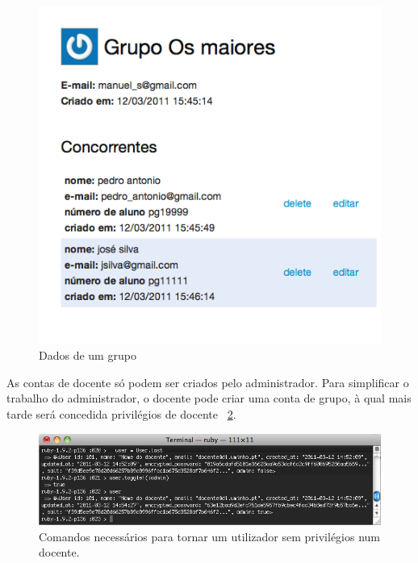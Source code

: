 \begin{figure}[H]
\begin{center}
\includegraphics[scale = 0.6]{Images/grupo}
\caption{Dados de um grupo}\label{img:grupo}
\end{center}
\end{figure} 



As contas de docente só podem ser criados pelo administrador. Para simplificar o trabalho do administrador, o docente pode criar 
uma conta de grupo, à qual mais tarde será concedida privilégios de docente ~\ref{img:userToAdmin}.

\begin{figure}[H]
\begin{center}
\includegraphics[scale=0.60]{Images/userToAdmin}
\caption{Comandos necessários para tornar um utilizador sem privilégios num docente.}\label{img:userToAdmin}
\end{center}
\end{figure} 

